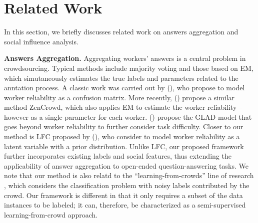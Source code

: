 \section{Related Work}

In this section, we briefly discusses related work on answers aggregation and social influence analysis.

\smallskip
\noindent\textbf{Answers Aggregation.} Aggregating workers' answers is a central problem in crowdsourcing. Typical methods include majority voting \cite{sheng2008get} and those based on EM, which simutaneously estimates the true labels and parameters related to the anntation process. A classic work was carried out by \citeauthor{dawid1979maximum} (\citeyear{dawid1979maximum}), who propose to model worker reliability as a confusion matrix. More recently, \citeauthor{demartini2012zencrowd} (\citeyear{demartini2012zencrowd}) propose a similar method ZenCrowd, which also applies EM to estimate the worker reliability -- however as a single parameter for each worker. \citeauthor{whitehill2009whose} (\citeyear{whitehill2009whose}) propose the GLAD model that goes beyond worker reliability to further consider task difficulty. Closer to our method is LFC proposed by \citeauthor{raykar2010learning} (\citeyear{raykar2010learning}), who consider to model worker reliability as a latent variable with a prior distribution. Unlike LFC, our proposed framework further incorporates existing labels and social features, thus extending the applicability of answer aggregation to open-ended question-answering tasks. We note that our method is also relatd to the ``learning-from-crowds'' line of research \cite{raykar2010learning,tian2012learning,yang2018leveraging}, which considers the classification problem with noisy labels contributed by the crowd. Our framework is different in that it only requires a subset of the data instances to be labeled; it can, therefore, be characterized as a semi-supervised learning-from-crowd approach. 


